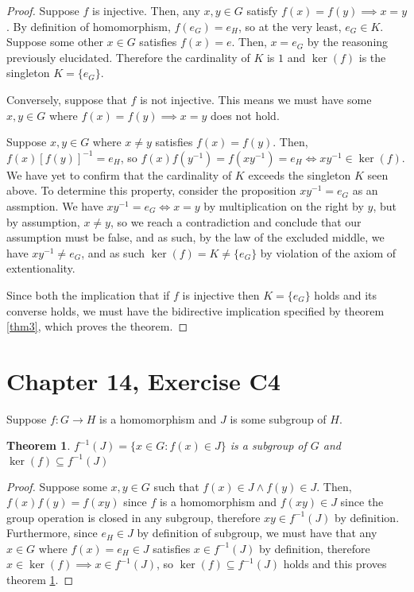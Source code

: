 \documentclass[12pt]{article}
\newtheorem{thm}{Theorem}
\begin{document}
\begin{proof}
	Suppose $f$ is injective.
	Then, any $x,y \in G$
	satisfy $f(x) = f(y) \implies x = y$.
	By definition of homomorphism, $f(e_G) = e_H$,
	so at the very least, $e_G \in K$.
	Suppose some other $x \in G$ satisfies $f(x) = e$.
	Then, $x = e_G$ by the reasoning previously elucidated.
	Therefore the cardinality of $K$ is $1$ and 
	$\ker(f)$ is the singleton $K = \{ e_G \}$.

	Conversely, suppose that $f$ is not injective.
	This means we must have some $x,y \in G$ where
	$f(x) = f(y) \implies x = y$ does not hold.
	
	Suppose $x,y \in G$ where $x \neq y$ satisfies $f(x) = f(y)$.
	Then, $f(x)[f(y)]^{-1} = e_H$,
	so $f(x)f(y^{-1}) = f(xy^{-1}) = e_H \iff xy^{-1} \in \ker(f)$.
	We have yet to confirm that the cardinality of $K$ exceeds
	the singleton $K$ seen above. To determine this property,
	consider the proposition $xy^{-1} = e_G$ as an assmption.
	We have $xy^{-1} = e_G \iff x = y$ by multiplication
	on the right by $y$, but by assumption, $x \neq y$,
	so we reach a contradiction and conclude that our assumption
	must be false,
	and as such, by the law of the excluded middle,
	we have $xy^{-1} \neq e_G$,
	and as such $\ker(f) = K \neq \{ e_G \}$ by violation
	of the axiom of extentionality.

	Since both the implication that
	if $f$ is injective
	then $K = \{ e_G \}$ holds
	and its converse holds,
	we must have the bidirective implication
	specified by theorem \ref{thm3},
	which proves the theorem.
\end{proof}

\section{Chapter 14, Exercise C4}

Suppose $f: G \to H$ is a homomorphism
and $J$ is some subgroup of $H$.

\begin{thm} \label{thm4}
	$f^{-1}(J) = \{ x \in G: f(x) \in J \}$ is a subgroup of $G$
	and $\ker(f) \subseteq f^{-1}(J)$
\end{thm}

\begin{proof}
	Suppose some $x,y \in G$ such that $f(x) \in J \land f(y) \in J$.
	Then, $f(x)f(y) = f(xy)$ since $f$ is a homomorphism
	and $f(xy) \in J$ since the group operation is closed
	in any subgroup, therefore $xy \in f^{-1}(J)$ by definition.
	Furthermore, since $e_H \in J$ by definition of subgroup,
	we must have that any $x \in G$ where $f(x) = e_H \in J$
	satisfies $x \in f^{-1}(J)$ by definition,
	therefore $x \in \ker(f) \implies x \in f^{-1}(J)$,
	so $\ker(f) \subseteq f^{-1}(J)$ holds
	and this proves theorem \ref{thm4}.
\end{proof}
\end{document}
